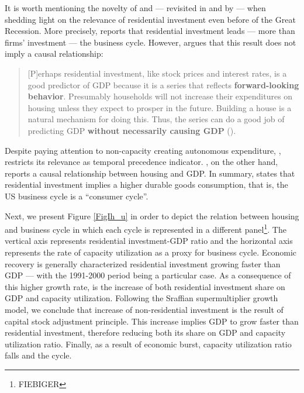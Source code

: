 It is worth mentioning the novelty of \textcite{green_follow_1997} and \textcite{leamer_housing_2007} --- revisited in \textcite{leamer_housing_2015} and by \textcite{fiebiger_trend_2017} --- when shedding light on the relevance of residential investment even before of the Great Recession.
More precisely, \textcite{green_follow_1997} reports that residential investment leads --- more than firms' investment --- the business cycle.
However, argues that this result does not imply a causal relationship:

\begin{quotation}
	[P]erhaps residential investment, like stock prices and interest rates, is a good predictor of GDP because it is a series that reflects \textbf{forward-looking behavior}. Presumably households will not increase their expenditures on housing unless they expect to prosper in the future. Building a house is a natural mechanism for doing this. Thus, the series can do a good job of predicting GDP \textbf{without necessarily causing GDP} (\cite[p.~267, ephasis added]{green_follow_1997}).
\end{quotation}
Despite paying attention to non-capacity creating autonomous expenditure, \textcite{green_follow_1997}, restricts its relevance as temporal precedence indicator.
\textcite{leamer_housing_2007}, on the other hand, reports a causal relationship between housing and GDP.
In summary, states that residential investment implies a higher durable goods consumption, that is, the US business cycle is a ``consumer cycle''.

Next, we present Figure \ref{FigIh_u} in order to depict the relation between housing and business cycle in which each cycle is represented in a different panel\footnote{FIEBIGER}. 
The vertical axis represents residential investment-GDP ratio and the horizontal
axis represents the rate of capacity utilization as a proxy for business cycle.
Economic recovery is generally characterized residential investment growing faster than GDP --- with the 1991-2000 period being a particular case. 
As a consequence of this higher growth rate, is the increase of both residential investment share on GDP and capacity utilization. 
Following the Sraffian supermultiplier growth model, we conclude that increase of non-residential investment is the result of capital stock adjustment principle.
This increase implies GDP to grow faster than residential investment, therefore reducing both its share on GDP and capacity utilization ratio. 
Finally, as a result of economic burst, capacity utilization ratio falls and the cycle.


